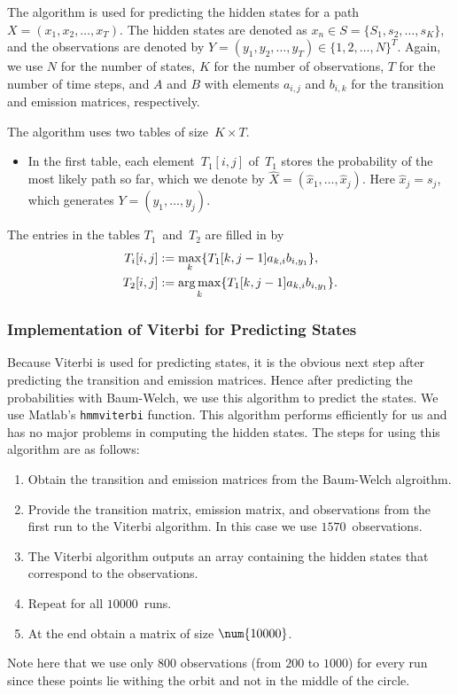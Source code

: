 \documentclass[twoside]{article}
\begin{document}
The algorithm is used for predicting the hidden states for a path ${X = (x_1, x_2, \ldots, x_T)}$.
The hidden states are denoted as ${x_n \in S = \{S_1, s_2, \ldots, s_K\}}$, and the observations are denoted by ${Y = (y_1, y_2, \ldots, y_T) \in {\{1, 2, \ldots, N\}}^T}$.
Again, we use $N$ for the number of states, $K$ for the number of observations, $T$ for the number of time steps, and $A$ and $B$ with elements $a_{i, j}$ and $b_{i, k}$ for the transition and emission matrices, respectively.

The algorithm uses two tables of size~${K \times T}$.
\begin{itemize}
\item In the first table, each element~$T_1[i, j]$ of~$T_1$ stores the probability of the most likely path so far, which we denote by ${\hat{X} = (\hat{x}_1,\ldots,\hat{x}_j)}$.
  Here ${\hat{x}_j = s_j}$, which generates ${Y = (y_1, \ldots, y_j)}$.
\end{itemize}

The entries in the tables $T_1$~and~$T_2$ are filled in by
\begin{align*}
  T_i[i, j] &:= \max_k \{T_1[k, j-1]a_{k, i} b_{i, y_1}\},\\
  T_2[i, j] &:= \operatorname*{arg\,max}_k \{T_1[k, j-1] a_{k, i} b_{i, y_1}\}.
\end{align*}

\subsubsection{Implementation of Viterbi for Predicting States}\label{sec:impl-viterbi-pred}

Because Viterbi is used for predicting states, it is the obvious next step after predicting the transition and emission matrices.
Hence after predicting the probabilities with Baum-Welch, we use this algorithm to predict the states.
We use Matlab's \texttt{\small{}hmmviterbi} function.
This algorithm performs efficiently for us and has no major problems in computing the hidden states.
The steps for using this algorithm are as follows:
\begin{enumerate}
\item Obtain the transition and emission matrices from the Baum-Welch algroithm.
\item Provide the transition matrix, emission matrix, and observations from the first run to the Viterbi algorithm.
  In this case we use $\num{1570}$~observations.
\item The Viterbi algorithm outputs an array containing the hidden states that correspond to the observations.
\item Repeat for all $\num{10000}$~runs.
\item At the end obtain a matrix of size ${\num{10000} \time 800}$.
\end{enumerate}
Note here that we use only $800$ observations (from $200$ to $\num{1000}$) for every run since these points lie withing the orbit and not in the middle of the circle.
\end{document}
